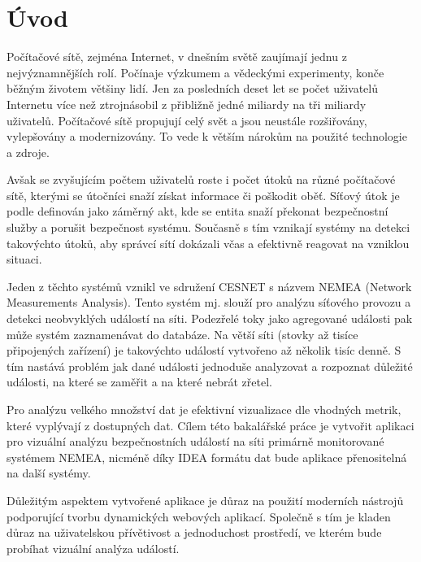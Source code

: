 
\newcommand\note[1]{{\Large \textcolor{red}{#1}}}

\chapter{Úvod}
Počítačové sítě, zejména Internet, v dnešním světě zaujímají jednu z nejvýznamnějších rolí. Počínaje výzkumem a vědeckými experimenty, konče běžným životem většiny lidí. Jen za posledních deset let se počet uživatelů Internetu více než ztrojnásobil z přibližně jedné miliardy na tři miliardy uživatelů. Počítačové sítě propujují celý svět a jsou neustále rozšiřovány, vylepšovány a modernizovány. To vede k větším nárokům na použité technologie a zdroje. 

Avšak se zvyšujícím počtem uživatelů roste i počet útoků na různé počítačové sítě, kterými se útočníci snaží získat informace či poškodit oběť. Síťový útok je podle \cite{rfc:attack} definován jako záměrný akt, kde se entita snaží překonat bezpečnostní služby a porušit bezpečnost systému. Současně s tím vznikají systémy na detekci takovýchto útoků, aby správcí sítí dokázali včas a efektivně reagovat na vzniklou situaci.

Jeden z těchto systémů vznikl ve sdružení CESNET s názvem NEMEA (Network Measurements Analysis). Tento systém mj. slouží pro analýzu síťového provozu a detekci neobvyklých událostí na síti. Podezřelé toky jako agregované události pak může systém zaznamenávat  do databáze. Na větší síti (stovky až tisíce připojených zařízení) je takovýchto událostí vytvořeno až několik tisíc denně. S tím nastává problém jak dané události jednoduše analyzovat a rozpoznat důležité události, na které se zaměřit a na které nebrát zřetel.

Pro analýzu velkého množství dat je efektivní vizualizace dle vhodných metrik, které vyplývají z dostupných dat. Cílem této bakalářské práce je vytvořit aplikaci pro vizuální analýzu bezpečnostních událostí na síti primárně monitorované systémem NEMEA, nicméně díky IDEA formátu dat bude aplikace přenositelná na další systémy. 

Důležitým aspektem vytvořené aplikace je důraz na použití moderních nástrojů podporující tvorbu dynamických webových aplikací. Společně s tím je kladen důraz na uživatelskou přívětivost a jednoduchost prostředí, ve kterém bude probíhat vizuální analýza událostí.

